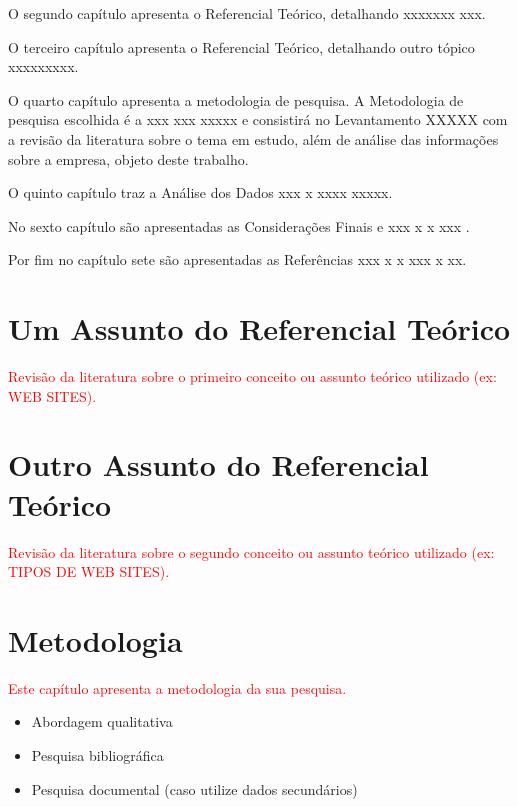 \documentclass[]{senac-tcc}
\begin{document}
O segundo capítulo apresenta o Referencial Teórico, detalhando xxxxxxx xxx.
	
O terceiro capítulo apresenta o Referencial Teórico, detalhando outro tópico xxxxxxxxx.

O quarto capítulo apresenta a metodologia de pesquisa. A Metodologia de pesquisa escolhida é a xxx xxx xxxxx e consistirá no Levantamento XXXXX com a revisão da literatura sobre o tema em estudo, além de análise das informações sobre a empresa, objeto deste trabalho.

O quinto capítulo traz a Análise dos Dados xxx x xxxx xxxxx.

No sexto capítulo são apresentadas as Considerações Finais e xxx x x xxx .

Por fim no capítulo sete são apresentadas as Referências xxx x x xxx x xx.

\chapter{Um Assunto do Referencial Teórico}

	\textcolor{red}{Revisão da literatura sobre o primeiro conceito ou assunto teórico utilizado (ex: WEB SITES).}
	
	\lipsum[8-9]

\chapter{Outro Assunto do Referencial Teórico}

    \textcolor{red}{Revisão da literatura sobre o segundo conceito ou assunto teórico utilizado (ex: TIPOS DE WEB SITES).}

	\lipsum[10-11]
	
\chapter{Metodologia}

\textcolor{red}{Este capítulo apresenta a metodologia da sua pesquisa.}

\begin{itemize}
    \item Abordagem qualitativa 
    \item Pesquisa bibliográfica
    \item Pesquisa documental (caso utilize dados secundários)
\end{itemize}
\end{document}
